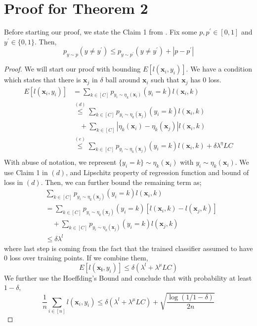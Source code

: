 \documentclass{article}
\begin{document}
\section{Proof for Theorem 2}
Before starting our proof, we state the Claim 1 from \cite{BerlindU15}. Fix some $p,p^\prime \in [0,1]$ and $y^\prime \in \{0,1\}$. Then,
\[
p_{y \sim p}(y \neq y^\prime) \leq p_{y \sim p^\prime}(y \neq y^\prime) + |p - p^\prime|
\]
\begin{proof}
We will start our proof with bounding $E[l(\mathbf{x}_i,y_i)]$. We have a condition which states that there is $\mathbf{x}_j$ in $\delta$ ball around $\mathbf{x}_i$ such that $\mathbf{x}_j$ has $0$ loss.
\[
\begin{aligned}
E[l(\mathbf{x}_i,y_i)] &= \sum_{k\in [C]} p_{y_i \sim \eta_k(\mathbf{x}_i)}(y_i = k) l(\mathbf{x}_i,k) \\
&\overset{(d)}{\leq} \sum_{k\in [C]} p_{y_i \sim \eta_k(\mathbf{x}_j)}(y_i = k) l(\mathbf{x}_i,k) \\ &\quad+ \sum_{k\in [C]}  |\eta_k(\mathbf{x}_i)-\eta_k(\mathbf{x}_j)| l(\mathbf{x}_i,k) \\
&\overset{(e)}{\leq} \sum_{k\in [C]} p_{y_i \sim \eta_k(\mathbf{x}_j)} (y_i = k) l(\mathbf{x}_i,k) + \delta \lambda^\eta L C\\ 
\end{aligned}
\]
With abuse of notation, we represent \mbox{$\{y_i=k\} \sim \eta_k(\mathbf{x}_i)$} with \mbox{$y_i \sim \eta_k(\mathbf{x}_i)$}. We use Claim 1 in $(d)$, and Lipschitz property of regression function and bound of loss in $(d)$. Then, we can further bound the remaining term as; 
\[
\begin{aligned}
&\sum_{k\in [C]} p_{y_i \sim \eta_k(\mathbf{x}_j)} (y_i = k) l(\mathbf{x}_i,k) \\
&= \sum_{k\in [C]} p_{y_i \sim \eta_k(\mathbf{x}_j)} (y_i = k) [l(\mathbf{x}_i,k) - l(\mathbf{x}_j,k) ] \\ &\quad+ \sum_{k\in [C]} p_{y_i \sim \eta_k(\mathbf{x}_j)} (y_i = k) l(\mathbf{x}_j,k) \\
&\leq \delta \lambda^l
\end{aligned}
\]
where last step is coming from the fact that the trained classifier assumed to have $0$ loss over training points. If we combine them,
\[
E[l(\mathbf{x_i},y_i)] \leq \delta( \lambda^l+\lambda^\mu LC)
\]
We further use the Hoeffding's Bound and conclude that with probability at least $1 - \delta$,
\[
\frac{1}{n}\sum_{i \in [n]} l(\mathbf{x}_i,y_i) \leq \delta (\lambda^l + \lambda^\mu LC)+ 
\sqrt{\frac{\log(1/1-\delta)}{2n}}
\]
\end{proof}

 

\end{document}
